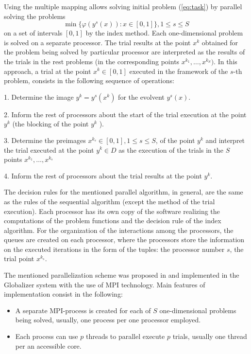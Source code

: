 \documentclass{svproc}
\begin{document}
Using the multiple mapping allows solving initial problem (\ref{eq:task}) by parallel solving the
problems
\[
\min\{\varphi(y^s(x)):x\in [0,1]\}, 1\leqslant s\leqslant S
\]
on a set of intervals $[0,1]$ by the index method. Each one-dimensional problem is solved on a
separate processor. The trial results at the point \(x^k\) obtained for the problem being solved by
particular processor are interpreted as the results of the trials in the rest problems (in the
corresponding points \(x^{k_1},\dots,x^{k_S})\). In this approach, a trial at the point \(x^k \in
[0,1]\) executed in the framework of the \(s\)-th problem, consists in the following sequence of
operations:
\par
1. Determine the image \(y^k=y^s (x^k)\) for the evolvent \(y^s (x)\).
\par
2. Inform the rest of processors about the start of the trial execution at the point \( y^k\) (the
blocking of the point \(y^k\) ).
\par
3. Determine the preimages \(x{}^{k_s}  \in [0,1], 1\leqslant s\leqslant S\), of the point \(y^k\) and interpret the
trial executed at the point \(y^k \in D \) as the execution of the trials in the \(S\) points
\(x{}^{k_1} ,\dots,x{}^{k_s} \)
\par
4. Inform the rest of processors about the trial results at the point \(y^k\).
\par
The decision rules for the mentioned parallel algorithm, in general, are the same as the rules of the
sequential algorithm (except the method of the trial execution). Each processor has its own copy
of the software realizing the computations of the problem functions and the decision rule of the
index algorithm. For the organization of the interactions among the processors, the queues are
created on each processor, where the processors store the information on the executed iterations
in the form of the tuples: the processor number \(s\), the trial point \(x{}^{k_s}\).
\par
The mentioned parallelization scheme was proposed in \cite{Gergel2009} and implemented in the Globalizer system with the use of MPI technology. Main
features of implementation consist in the following:
\begin{itemize}
  \item A separate MPI-process is created for each
 of \(S\) one-dimensional problems being solved, usually, one process per one processor
 employed.
 \item Each process can use $p$ threads to parallel execute $p$ trials, usually one thread per an accessible core.
\end{itemize}
\end{document}
